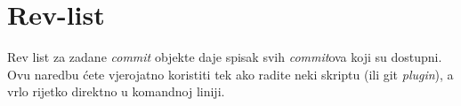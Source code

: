 \section*{Rev-list}

Rev list za zadane \emph{commit} objekte daje spisak svih \emph{commit}ova koji su dostupni.
Ovu naredbu ćete vjerojatno koristiti tek ako radite neki skriptu (ili git \emph{plugin}), a vrlo rijetko direktno u komandnoj liniji.

